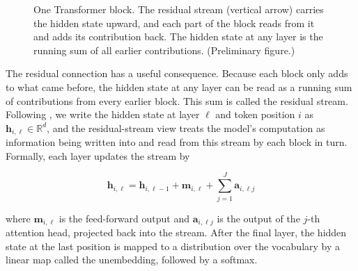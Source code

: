 \begin{figure}[htbp]
\centering
{}
\caption{One Transformer block. The residual stream (vertical arrow) carries the hidden state upward, and each part of the block reads from it and adds its contribution back. The hidden state at any layer is the running sum of all earlier contributions. (Preliminary figure.)}
\label{fig:transformer}
\end{figure}

The residual connection has a useful consequence.
Because each block only adds to what came before, the hidden state at any layer can be read as a running sum of contributions from every earlier block.
This sum is called the residual stream.
Following \textcite{todd2024function}, we write the hidden state at layer $\ell$ and token position $i$ as $\mathbf{h}_{i,\ell} \in \mathbb{R}^d$, and the residual-stream view treats the model's computation as information being written into and read from this stream by each block in turn.
Formally, each layer updates the stream by \cite[p.~3]{todd2024function}

\begin{equation}
\mathbf{h}_{i,\ell} = \mathbf{h}_{i,\ell-1} + \mathbf{m}_{i,\ell} + \sum_{j=1}^{J} \mathbf{a}_{i,\ell j}
\label{eq:residual}
\end{equation}

where $\mathbf{m}_{i,\ell}$ is the feed-forward output and $\mathbf{a}_{i,\ell j}$ is the output of the $j$-th attention head, projected back into the stream.
After the final layer, the hidden state at the last position is mapped to a distribution over the vocabulary by a linear map called the unembedding, followed by a softmax.
\\


